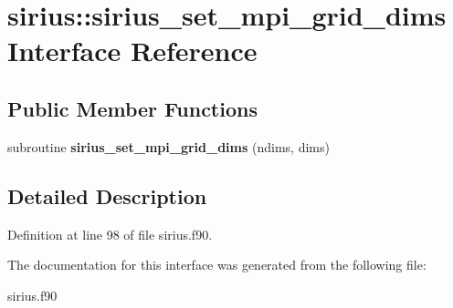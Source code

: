 \hypertarget{interfacesirius_1_1sirius__set__mpi__grid__dims}{}\section{sirius\+:\+:sirius\+\_\+set\+\_\+mpi\+\_\+grid\+\_\+dims Interface Reference}
\label{interfacesirius_1_1sirius__set__mpi__grid__dims}
\subsection*{Public Member Functions}
\begin{DoxyCompactItemize}
\item 
\hypertarget{interfacesirius_1_1sirius__set__mpi__grid__dims_a7e4c06262eb4245ffa079edc85ec2eaa}{}subroutine {\bfseries sirius\+\_\+set\+\_\+mpi\+\_\+grid\+\_\+dims} (ndims, dims)\label{interfacesirius_1_1sirius__set__mpi__grid__dims_a7e4c06262eb4245ffa079edc85ec2eaa}

\end{DoxyCompactItemize}


\subsection{Detailed Description}


Definition at line 98 of file sirius.\+f90.



The documentation for this interface was generated from the following file\+:\begin{DoxyCompactItemize}
\item 
sirius.\+f90\end{DoxyCompactItemize}
